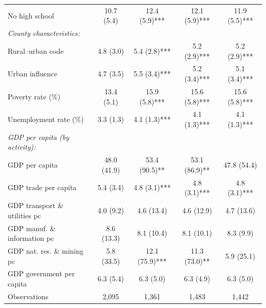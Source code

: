 \begin{tabular}{l*{4}{c}}
No high school & 10.7 (5.4) & 12.4 (5.9)*** & 12.1 (5.9)*** & 11.9 (5.5)*** \\
\quad \emph{County characteristics:} & & & & \\
Rural--urban code & 4.8 (3.0) & 5.4 (2.8)*** & 5.2 (2.9)*** & 5.2 (2.9)*** \\
Urban influence & 4.7 (3.5) & 5.5 (3.4)*** & 5.2 (3.4)*** & 5.1 (3.4)*** \\
Poverty rate (\%) & 13.4 (5.1) & 15.9 (5.8)*** & 15.6 (5.8)*** & 15.6 (5.8)*** \\
Unemployment rate (\%) & 3.3 (1.3) & 4.1 (1.3)*** & 4.1 (1.3)*** & 4.1 (1.3)*** \\
\quad \emph{GDP per capita (by activity):} & & & & \\
GDP per capita & 48.0 (41.9) & 53.4 (90.5)** & 53.1 (86.9)** & 47.8 (54.4) \\
GDP trade per capita & 5.4 (3.4) & 4.8 (3.1)*** & 4.8 (3.1)*** & 4.8 (3.1)*** \\
GDP transport \& utilities pc & 4.0 (9.2) & 4.6 (13.4) & 4.6 (12.9) & 4.7 (13.6) \\
GDP manuf. \& information pc & 8.6 (13.3) & 8.1 (10.4) & 8.1 (10.1) & 8.3 (9.9) \\
GDP nat. res. \& mining pc & 5.8 (33.5) & 12.1 (75.9)*** & 11.3 (73.0)** & 5.9 (25.1) \\
GDP government per capita & 6.3 (5.4) & 6.3 (5.0) & 6.3 (4.9) & 6.3 (5.0) \\
Observations & 2,095 & 1,361 & 1,483 & 1,442 \\
\bottomrule
\end{tabular}
